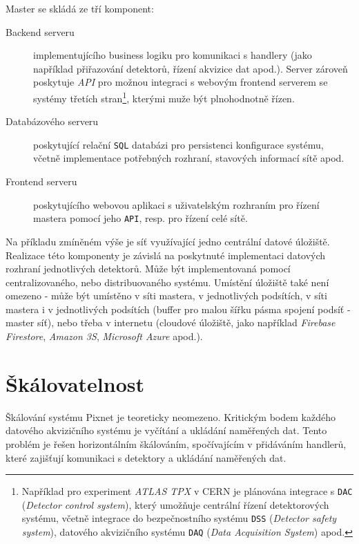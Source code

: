 Master se skládá ze tří komponent:
\begin{description}
    \item[Backend serveru] implementujícího business logiku pro komunikaci s handlery (jako například přiřazování detektorů, řízení akvizice dat apod.). Server zároveň poskytuje \textit{API} pro možnou integraci s webovým frontend serverem se systémy třetích stran\footnote{Například pro experiment \textit{ATLAS TPX} v CERN je plánována integrace s \texttt{DAC} \cite{cern_dcs} (\textit{Detector control system}), který umožňuje centrální řízení detektorových systému, včetně integrace do bezpečnostního systému \texttt{DSS} (\textit{Detector safety system}), datového akvizičního systému \texttt{DAQ} (\textit{Data Acquisition System}) apod.}, kterými muže být plnohodnotně řízen.
    \item[Databázového serveru] poskytující relační \texttt{SQL} databázi pro persistenci konfigurace systému, včetně implementace potřebných rozhraní, stavových informací sítě apod.
    \item[Frontend serveru] poskytujícího webovou aplikaci s uživatelským rozhraním pro řízení mastera pomocí jeho \texttt{API}, resp. pro řízení celé sítě.
\end{description}

Na příkladu zmíněném výše je síť využívající jedno centrální datové úložiště. Realizace této komponenty je závislá na poskytnuté implementaci datových rozhraní jednotlivých detektorů. Může být implementovaná pomocí centralizovaného, nebo distribuovaného systému. Umístění úložiště také není omezeno - může být umístěno v síti mastera, v jednotlivých podsítích, v síti mastera i v jednotlivých podsítích (buffer pro malou šířku pásma spojení podsíť - master síť), nebo třeba v internetu (cloudové úložiště, jako například \textit{Firebase Firestore}, \textit{Amazon 3S}, \textit{Microsoft Azure} apod.).

\section{Škálovatelnost}
Škálování systému Pixnet je teoreticky neomezeno. Kritickým bodem každého datového akvizičního systému je vyčítání a ukládání naměřených dat. Tento problém je řešen horizontálním škálováním, spočívajícím v přidáváním handlerů, které zajišťují komunikaci s detektory a ukládání naměřených dat.

